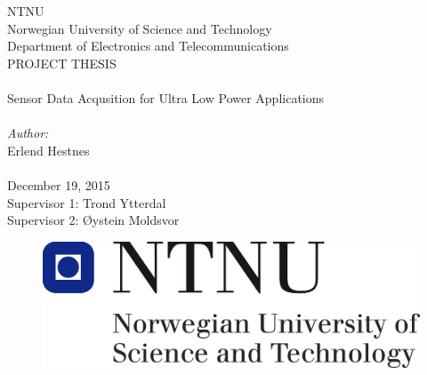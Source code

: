 \thispagestyle{empty}

\begin{center}

\Large{NTNU}\\
\normalsize{Norwegian University of Science and Technology}\\
Department of Electronics and Telecommunications\\
[1pc]
\Large{PROJECT THESIS}\\

\Huge{\hrulefill\\Sensor Data Acqusition for Ultra Low Power Applications\\\hrulefill}\\[2pc]

\small{\textit{Author:}}\\\Large{Erlend Hestnes}\\
\mbox{}\\[3pc]
\large{December 19, 2015}\\[2pc]

\small{Supervisor 1: Trond Ytterdal} \\
\small{Supervisor 2: Øystein Moldsvor}

\end{center}
\vfill

\begin{figure}[h]
\centering
\includegraphics[scale=0.5]{fig/NTNU.png}
\label{fig:frontpage_logo}
\end{figure}
